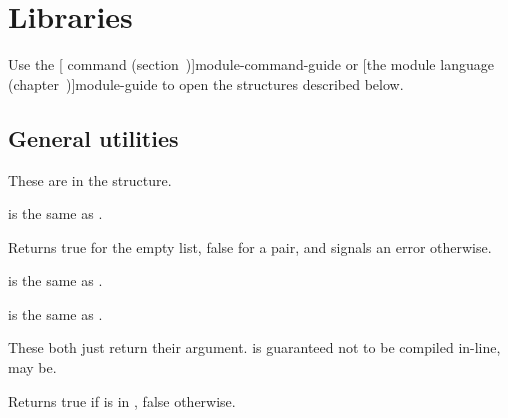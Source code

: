

\chapter{Libraries}

Use the
[ command (section~\Ref{})]{module-command-guide}
 or
[the module language (chapter~\Ref)]{module-guide}
 to open the structures described below.

\section{General utilities}
\label{big-util}


These are in the  structure.

\begin{protos}
\end{protos}
%
 is the same as .

\begin{protos}
\end{protos}
%
Returns true for the empty list, false for a pair, and signals an
error otherwise.

\begin{protos}
\end{protos}
 is the same as .

\begin{protos}
\end{protos}
 is the same as .

\begin{protos}
\end{protos}
These both just return their argument.   is guaranteed not to
be compiled in-line,  may be.

\begin{protos}
\end{protos}
%
Returns true if  is in , false otherwise.

